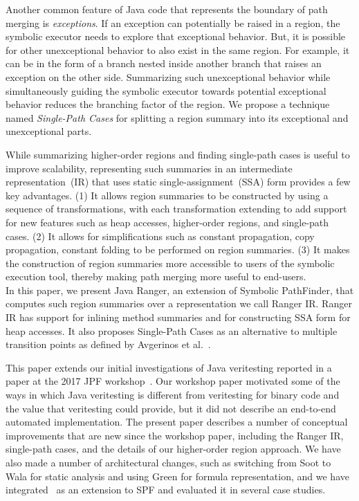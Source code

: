 Another common feature of Java code that represents the boundary of path merging is \textit{exceptions}.
%
If an exception can potentially be raised in a region, the symbolic executor needs to explore that exceptional behavior.
%
But, it is possible for other unexceptional behavior to also exist in the same region.
%
For example, it can be in the form of a branch nested inside another branch that raises an exception on the other side.
%
Summarizing such unexceptional behavior while simultaneously guiding the symbolic executor towards potential exceptional
behavior reduces the branching factor of the region.
%
We propose a technique named \textit{Single-Path Cases} for splitting a region summary into its exceptional and
unexceptional parts.

While summarizing higher-order regions and finding single-path cases is useful to improve scalability,
representing such summaries in an intermediate representation~(IR) that uses static single-assignment~(SSA) form
provides a few key advantages.
%
(1) It allows region summaries to be constructed by using a sequence of transformations, with each transformation
extending to add support for new features such as heap accesses, higher-order regions, and single-path cases.
%
(2) It allows for simplifications such as constant propagation, copy propagation, constant folding to be performed on
region summaries.
%
(3) It makes the construction of region summaries more accessible to users of the symbolic execution tool, thereby making
path merging more useful to end-users.\\
%
In this paper, we present Java Ranger, an extension of Symbolic PathFinder, that computes such region summaries over a representation we call
Ranger IR.
%
Ranger IR has support for inlining method summaries and for constructing SSA form for heap accesses.
%
It also proposes Single-Path Cases as an alternative to multiple transition points as
defined by Avgerinos et al.~\cite{veritesting}.

This paper extends our initial investigations of Java veritesting
reported in a paper at the 2017 JPF
workshop~\cite{sharma-veritesting}.
%
Our workshop paper motivated some of the ways in which Java
veritesting is different from veritesting for binary code and the
value that veritesting could provide, but it did not describe an
end-to-end automated implementation.
%
The present paper describes a number of conceptual improvements that
are new since the workshop paper, including the Ranger IR, single-path
cases, and the details of our higher-order region approach.
%
We have also made a number of architectural changes, such as switching
from Soot to Wala for static analysis and using Green for formula
representation, and we have integrated \tool\ as an extension to SPF
and evaluated it in several case studies.

